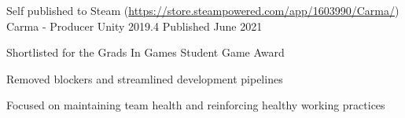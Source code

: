 \begin{cventries}
    \cventry
    {Self published to Steam (\href{https://store.steampowered.com/app/1603990/Carma/}{https://store.steampowered.com/app/1603990/Carma/})}
    {Carma - Producer}
    {Unity 2019.4}
    {Published June 2021}
    {
        \begin{cvitems}
            \item Shortlisted for the Grads In Games Student Game Award
            \item Removed blockers and streamlined development pipelines
            \item Focused on maintaining team health and reinforcing healthy working practices
        \end{cvitems}
    }

\end{cventries}